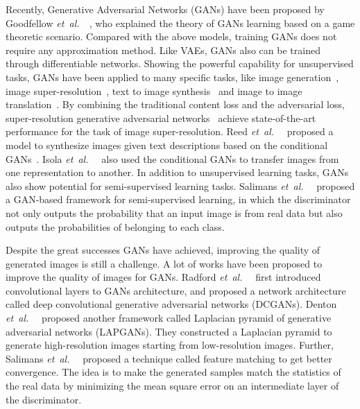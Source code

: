 \documentclass{article} %
\def\etal{{\textit{et~al.~}}}
\begin{document}
Recently, Generative Adversarial Networks (GANs) have been proposed by Goodfellow \etal ~\cite{Goodfellow2014}, who explained the theory of GANs learning based on a game theoretic scenario. Compared with the above models, training GANs does not require any approximation method. Like VAEs, GANs also can be trained through differentiable networks. Showing the powerful capability for unsupervised tasks, GANs have been applied to many specific tasks, like image generation~\cite{Chen2016}, image super-resolution~\cite{Ledig2016},  text to image synthesis~\cite{Reed2016} and image to image translation~\cite{Isola2016}. By combining the traditional content loss and the adversarial loss, super-resolution generative adversarial networks~\cite{Ledig2016} achieve state-of-the-art performance for the task of image super-resolution. Reed \etal ~\cite{Reed2016} proposed a model to synthesize images given text descriptions based on the conditional GANs~\cite{Mirza2014}. Isola \etal~\cite{Isola2016} also used the conditional GANs to transfer images from one representation to another. In addition to unsupervised learning tasks, GANs also show potential for semi-supervised learning tasks. Salimans \etal ~\cite{Salimans2016} proposed a GAN-based framework for semi-supervised learning, in which the discriminator not only outputs the probability that an input image is from real data but also outputs the probabilities of belonging to each class.

Despite the great successes GANs have achieved, improving the quality of generated images is still a challenge. A lot of works have been proposed to improve the quality of images for GANs. Radford \etal~\cite{Radford2015} first introduced convolutional layers to GANs architecture, and proposed a network architecture called deep convolutional generative adversarial networks (DCGANs). Denton \etal~\cite{Denton2015} proposed another framework called Laplacian pyramid of generative adversarial networks (LAPGANs). They constructed a Laplacian pyramid to generate high-resolution images starting from low-resolution images. Further, Salimans \etal ~\cite{Salimans2016} proposed a technique called feature matching to get better convergence. The idea is to make the generated samples match the statistics of the real data by minimizing the mean square error on an intermediate layer of the discriminator.
\end{document}
